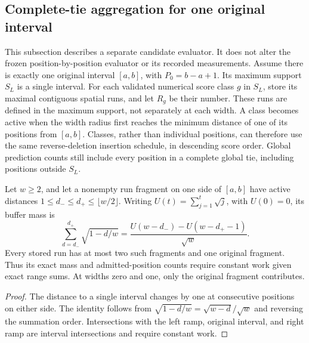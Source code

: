 \subsection{Complete-tie aggregation for one original interval}
\label{sec:tie-run-method}
This subsection describes a separate candidate evaluator. It does not alter
the frozen position-by-position evaluator or its recorded measurements.
Assume there is exactly one original interval $[a,b]$, with
$P_0=b-a+1$. Its maximum support $S_L$ is a single interval. For each
validated numerical score class $g$ in $S_L$, store its maximal contiguous
spatial runs, and let $R_g$ be their number. These runs are defined in the
maximum support, not separately at each width. A class becomes active when
the width radius first reaches the minimum distance of one of its positions
from $[a,b]$. Classes, rather than individual positions, can therefore use
the same reverse-deletion insertion schedule, in descending score order.
Global prediction counts still include every position in a complete global
tie, including positions outside $S_L$.

\begin{lemma}
Let $w\ge2$, and let a nonempty run fragment on one side of $[a,b]$
have active distances $1\le d_-\le d_+\le\lfloor w/2\rfloor$.
Writing $U(t)=\sum_{j=1}^{t}\sqrt j$, with $U(0)=0$, its buffer mass is
\[
 \sum_{d=d_-}^{d_+}\sqrt{1-d/w}
 =\frac{U(w-d_-)-U(w-d_+-1)}{\sqrt w}.
\]
Every stored run has at most two such fragments and one original fragment.
Thus its exact mass and admitted-position counts require constant work
given exact range sums. At widths zero and one, only the original fragment
contributes.
\end{lemma}
\begin{proof}
The distance to a single interval changes by one at consecutive positions
on either side. The identity follows from
$\sqrt{1-d/w}=\sqrt{w-d}/\sqrt w$ and reversing the summation order.
Intersections with the left ramp, original interval, and right ramp
are interval intersections and require constant work.
\end{proof}

